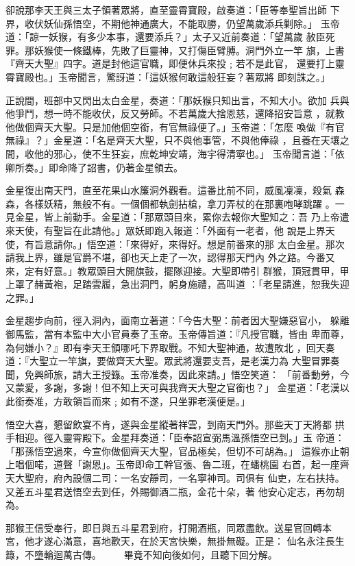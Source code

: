\begin{pinyinscope}
{卻說那李天王與三太子領著眾將，直至靈霄寶殿，啟奏道：「臣等奉聖旨出師
下界，收伏妖仙孫悟空，不期他神通廣大，不能取勝，仍望萬歲添兵剿除。」
玉帝道：「諒一妖猴，有多少本事，還要添兵？」太子又近前奏道：「望萬歲
赦臣死罪。那妖猴使一條鐵棒，先敗了巨靈神，又打傷臣臂膊。洞門外立一竿
旗，上書『齊天大聖』四字。道是封他這官職，即便休兵來投﹔若不是此官，
還要打上靈霄寶殿也。」玉帝聞言，驚訝道：「這妖猴何敢這般狂妄？著眾將
即刻誅之。」

正說間，班部中又閃出太白金星，奏道：「那妖猴只知出言，不知大小。欲加
兵與他爭鬥，想一時不能收伏，反又勞師。不若萬歲大捨恩慈，還降招安旨意
，就教他做個齊天大聖。只是加他個空銜，有官無祿便了。」玉帝道：「怎麼
喚做『有官無祿』？」金星道：「名是齊天大聖，只不與他事管，不與他俸祿
，且養在天壤之間，收他的邪心，使不生狂妄，庶乾坤安靖，海宇得清寧也。」
玉帝聞言道：「依卿所奏。」即命降了詔書，仍著金星領去。

金星復出南天門，直至花果山水簾洞外觀看。這番比前不同，威風凜凜，殺氣
森森，各樣妖精，無般不有。一個個都執劍拈槍，拿刀弄杖的在那裏咆哮跳躍
。一見金星，皆上前動手。金星道：「那眾頭目來，累你去報你大聖知之：吾
乃上帝遣來天使，有聖旨在此請他。」眾妖即跑入報道：「外面有一老者，他
說是上界天使，有旨意請你。」悟空道：「來得好，來得好。想是前番來的那
太白金星。那次請我上界，雖是官爵不堪，卻也天上走了一次，認得那天門內
外之路。今番又來，定有好意。」教眾頭目大開旗鼓，擺隊迎接。大聖即帶引
群猴，頂冠貫甲，甲上罩了赭黃袍，足踏雲履，急出洞門，躬身施禮，高叫道
：「老星請進，恕我失迎之罪。」

金星趨步向前，徑入洞內，面南立著道：「今告大聖：前者因大聖嫌惡官小，
躲離御馬監，當有本監中大小官員奏了玉帝。玉帝傳旨道：『凡授官職，皆由
卑而尊，為何嫌小？』即有李天王領哪吒下界取戰。不知大聖神通，故遭敗北
，回天奏道：『大聖立一竿旗，要做齊天大聖。眾武將還要支吾，是老漢力為
大聖冒罪奏聞，免興師旅，請大王授籙。玉帝准奏，因此來請。」悟空笑道：
「前番動勞，今又蒙愛，多謝，多謝！但不知上天可與我齊天大聖之官銜也？」
金星道：「老漢以此銜奏准，方敢領旨而來﹔如有不遂，只坐罪老漢便是。」

悟空大喜，懇留飲宴不肯，遂與金星縱著祥雲，到南天門外。那些天丁天將都
拱手相迎。徑入靈霄殿下。金星拜奏道：「臣奉詔宣弼馬溫孫悟空已到。」玉
帝道：「那孫悟空過來，今宣你做個齊天大聖，官品極矣，但切不可胡為。」
這猴亦止朝上唱個喏，道聲「謝恩」。玉帝即命工幹官張、魯二班，在蟠桃園
右首，起一座齊天大聖府，府內設個二司：一名安靜司，一名寧神司。司俱有
仙吏，左右扶持。又差五斗星君送悟空去到任，外賜御酒二瓶，金花十朵，著
他安心定志，再勿胡為。

那猴王信受奉行，即日與五斗星君到府，打開酒瓶，同眾盡飲。送星官回轉本
宮，他才遂心滿意，喜地歡天，在於天宮快樂，無掛無礙。正是：
    仙名永注長生籙，不墮輪迴萬古傳。
　　畢竟不知向後如何，且聽下回分解。





}
\end{pinyinscope}
